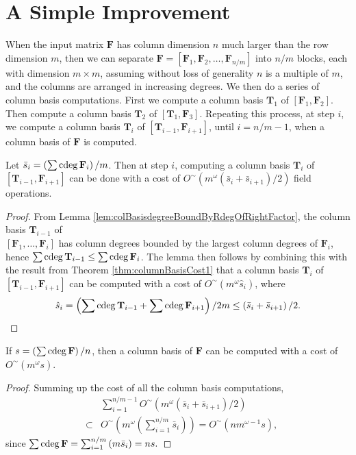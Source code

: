
\section{\label{sec:successiveColBasisComputation}A Simple Improvement}

When the input matrix $\mathbf{F}$ has column dimension $n$ much larger
than the row dimension $m$, then we can separate $\mathbf{F}=\left[\mathbf{F}_{1},\mathbf{F}_{2},\dots,\mathbf{F}_{n/m}\right]$
into $n/m$ blocks, each with dimension $m\times m$, assuming without
loss of generality $n$ is a multiple of $m$, and the columns are
arranged in increasing degrees. We then do a series of column basis
computations. First we compute a column basis $\mathbf{T}_{1}$ of
$\left[\mathbf{F}_{1},\mathbf{F}_{2}\right]$. Then compute a column
basis $\mathbf{T}_{2}$ of $\left[\mathbf{T}_{1},\mathbf{F}_{3}\right]$.
Repeating this process, at step $i$, we compute a column basis $\mathbf{T}_{i}$
of $\left[\mathbf{T}_{i-1},\mathbf{F}_{i+1}\right]$, until $i=n/m-1$,
when a column basis of $\mathbf{F}$ is computed. 
\begin{lem}
Let $\bar{s}_{i}=\left(\sum{\rm cdeg}\,\mathbf{F}_{i}\right)/m$. Then at
step $i$, computing a column basis $\mathbf{T}_{i}$ of $\left[\mathbf{T}_{i-1},\mathbf{F}_{i+1}\right]$
can be done with a cost of $O^{\sim}\left(m^{\omega}(\bar{s}_{i}+\bar{s}_{i+1})/2\right)$
field operations.\end{lem}
\begin{proof}
From Lemma \ref{lem:colBasisdegreeBoundByRdegOfRightFactor}, the
column basis $\mathbf{T}_{i-1}$ of \\$\left[\mathbf{F}_{1},\dots,\mathbf{F}_{i}\right]$
has column degrees bounded by the largest column degrees of $\mathbf{F}_{i}$,
hence $\sum{\rm cdeg}\,\mathbf{T}_{i-1}\le\sum{\rm cdeg}\,\mathbf{F}_{i}$. The
lemma then follows by combining this with the result from Theorem
\ref{thm:columnBasisCost1} that a column basis $\mathbf{T}_{i}$
of $\left[\mathbf{T}_{i-1},\mathbf{F}_{i+1}\right]$ can be computed
with a cost of $O^{\sim}\left(m^{\omega}\hat{s}_{i}\right)$, where
\[
\hat{s}_{i}=\left(\sum{\rm cdeg}\,\mathbf{T}_{i-1}+\sum{\rm cdeg}\,\mathbf{F}_{i+1}\right)/2m\le\left(\bar{s}_{i}+\bar{s}_{i+1}\right)/2.
\]
 \end{proof}
\begin{thm}
If $s=\left(\sum{\rm cdeg}\,\mathbf{F}\right)/n$, then \label{thm:finalCollBasisCost} a
column basis of $\mathbf{F}$ can be computed with a cost of $O^{\sim}\left(m^{\omega}s\right)$. \end{thm}
\begin{proof}
Summing up the cost of all the column basis computations, 
\begin{eqnarray*}
 &  & \sum_{i=1}^{n/m-1}O^{\sim}\left(m^{\omega}\left(\bar{s}_{i}+\bar{s}_{i+1}\right)/2\right)\\
 & \subset & O^{\sim}\left(m^{\omega}\left(\sum_{i=1}^{n/m}\bar{s}_{i}\right)\right)=O^{\sim}\left(nm^{\omega-1}s\right),
\end{eqnarray*}
 since $\sum{\rm cdeg}\,\mathbf{F}=\sum_{i=1}^{n/m}\left(m\bar{s}_{i}\right)=ns.$\end{proof}
